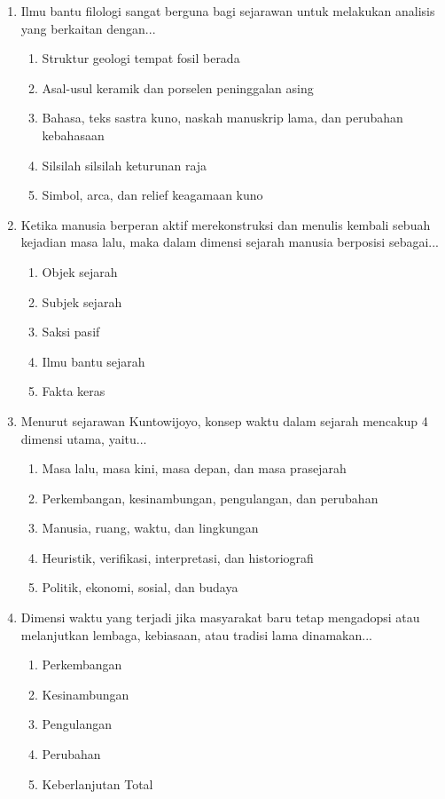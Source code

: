 \documentclass[12pt, a4paper]{article}
\begin{document}
\begin{enumerate}[label=\arabic*.]
    \item Ilmu bantu filologi sangat berguna bagi sejarawan untuk melakukan analisis yang berkaitan dengan...
    \begin{enumerate}[label=\Alph*.]
        \item Struktur geologi tempat fosil berada
        \item Asal-usul keramik dan porselen peninggalan asing
        \item Bahasa, teks sastra kuno, naskah manuskrip lama, dan perubahan kebahasaan
        \item Silsilah silsilah keturunan raja
        \item Simbol, arca, dan relief keagamaan kuno
    \end{enumerate}

    \item Ketika manusia berperan aktif merekonstruksi dan menulis kembali sebuah kejadian masa lalu, maka dalam dimensi sejarah manusia berposisi sebagai...
    \begin{enumerate}[label=\Alph*.]
        \item Objek sejarah
        \item Subjek sejarah
        \item Saksi pasif
        \item Ilmu bantu sejarah
        \item Fakta keras
    \end{enumerate}

    \item Menurut sejarawan Kuntowijoyo, konsep waktu dalam sejarah mencakup 4 dimensi utama, yaitu...
    \begin{enumerate}[label=\Alph*.]
        \item Masa lalu, masa kini, masa depan, dan masa prasejarah
        \item Perkembangan, kesinambungan, pengulangan, dan perubahan
        \item Manusia, ruang, waktu, dan lingkungan
        \item Heuristik, verifikasi, interpretasi, dan historiografi
        \item Politik, ekonomi, sosial, dan budaya
    \end{enumerate}

    \item Dimensi waktu yang terjadi jika masyarakat baru tetap mengadopsi atau melanjutkan lembaga, kebiasaan, atau tradisi lama dinamakan...
    \begin{enumerate}[label=\Alph*.]
        \item Perkembangan
        \item Kesinambungan
        \item Pengulangan
        \item Perubahan
        \item Keberlanjutan Total
    \end{enumerate}


\end{enumerate}
\end{document}
